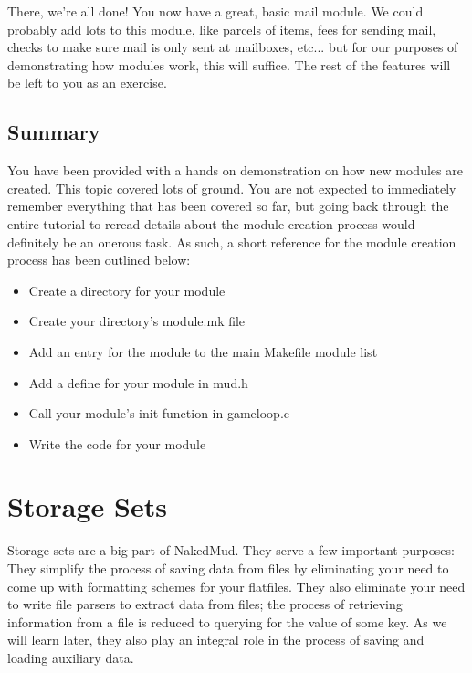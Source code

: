 \documentclass[12pt]{article}
\begin{document}
There, we're all done! You now have a great, basic mail module. We could probably add lots to this module, like parcels of items, fees for sending mail, checks to make sure mail is only sent at mailboxes, etc... but for our purposes of demonstrating how modules work, this will suffice. The rest of the features will be left to you as an exercise.


  
\subsection{Summary}
You have been provided with a hands on demonstration on how new modules are created. This topic covered lots of ground. You are not expected to immediately remember everything that has been covered so far, but going back through the entire tutorial to reread details about the module creation process would definitely be an onerous task. As such, a short reference for the module creation process has been outlined below:

\begin{itemize}
\item Create a directory for your module
\item Create your directory's module.mk file
\item Add an entry for the module to the main Makefile module list
\item Add a define for your module in mud.h
\item Call your module's init function in gameloop.c
\item Write the code for your module
\end{itemize}



\newpage \section{Storage Sets}
Storage sets are a big part of NakedMud. They serve a few important purposes: They simplify the process of saving data from files by eliminating your need to come up with formatting schemes for your flatfiles. They also eliminate your need to write file parsers to extract data from files; the process of retrieving information from a file is reduced to querying for the value of some key. As we will learn later, they also play an integral role in the process of saving and loading auxiliary data.
\end{document}
